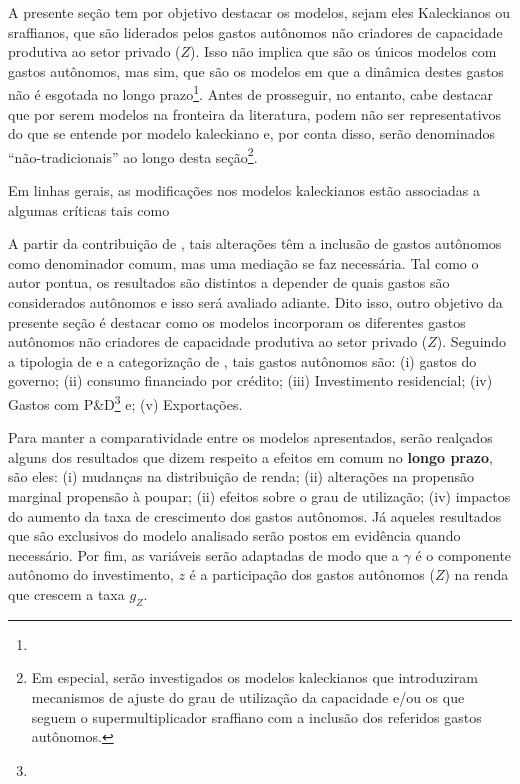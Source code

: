 

A presente seção tem por objetivo destacar os modelos, sejam eles Kaleckianos ou sraffianos, que são liderados pelos gastos autônomos não criadores de capacidade produtiva ao setor privado ($Z$). Isso não implica que são os únicos modelos com gastos autônomos, mas sim, que são os modelos em que a dinâmica destes gastos não é esgotada no longo prazo\footnote{
}.
Antes de prosseguir, no entanto, cabe destacar que por serem modelos na fronteira da literatura, podem não ser representativos do que se entende por modelo kaleckiano e, por conta disso, serão denominados ``não-tradicionais'' ao longo desta seção\footnote{Em especial,  serão investigados os modelos kaleckianos que introduziram mecanismos de ajuste do grau de utilização da capacidade e/ou os que seguem o supermultiplicador sraffiano com a inclusão dos referidos gastos autônomos.}.

Em linhas gerais, as modificações nos modelos kaleckianos estão associadas a algumas críticas tais como

A partir da contribuição de \textcite{allain_macroeconomic_2014}, tais alterações têm a inclusão de gastos autônomos como denominador comum, mas uma mediação se faz necessária. 
Tal como o autor pontua, os resultados são distintos a depender de quais gastos são considerados autônomos e isso será avaliado adiante. 
Dito isso, outro objetivo da presente seção é destacar como os modelos incorporam os diferentes gastos autônomos não criadores de capacidade produtiva ao setor privado ($Z$). Seguindo a tipologia de \textcite{cesaratto_technical_2003} e a categorização de \textcite{serrano_sraffian_1995}, tais gastos autônomos são: (i) gastos do governo; (ii) consumo financiado por crédito; (iii) Investimento residencial; (iv) Gastos com P\&D\footnote{
} e; (v) Exportações.

Para manter a comparatividade entre os modelos apresentados, serão realçados alguns dos resultados que dizem respeito a efeitos em comum no \textbf{longo prazo}, são eles: (i) mudanças na distribuição de renda; (ii) alterações na propensão marginal propensão à poupar; (ii) efeitos sobre o grau de utilização; (iv) impactos do aumento da taxa de crescimento dos gastos autônomos. Já aqueles resultados que são exclusivos do modelo analisado serão postos em evidência quando necessário. Por fim, as variáveis serão adaptadas de modo que a $\gamma$ é o componente autônomo do investimento,  $z$ é a participação dos gastos autônomos ($Z$) na renda que crescem a taxa $g_Z$.


